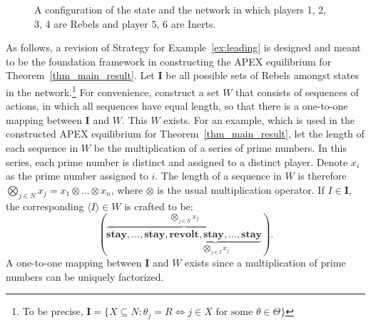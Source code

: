 \documentclass[12pt,letter]{article}
\theoremstyle{definition}
\theoremstyle{remark}
\theoremstyle{claim}
\begin{document}
\begin{figure}
\begin{center}
\end{center}
\caption{A configuration of the state and the network in which players 1, 2, 3, 4 are Rebels and player 5, 6 are Inerts.}
\label{fig:circle_with_bridge_4}
\end{figure}

As follows, a revision of Strategy for Example~\ref{ex:leading} is designed and meant to be the foundation framework in constructing the APEX equilibrium for Theorem~\ref{thm_main_result}. Let $\mathbf{I}$ be all possible sets  of Rebels amongst states in the network.\footnote{To be precise, $\mathbf{I}=\{X\subseteq N: \theta_j=R \Leftrightarrow j\in X \text{ for some $\theta\in\Theta$}\}$} 
For convenience, construct a set $W$ that consists of sequences of actions, in which all sequences have equal length, so that there is a one-to-one mapping between $\mathbf{I}$ and $W$. This $W$ exists. For an example, which is used in the constructed APEX equilibrium for Theorem~\ref{thm_main_result}, let the length of each sequence in $W$ be the multiplication of a series of prime numbers. In this series, each prime number is distinct and assigned to a distinct player. Denote $x_i$ as the prime number assigned to $i$. The length of a sequence in $W$ is therefore $\bigotimes_{j\in N}x_j=x_1\otimes...\otimes x_n$, where $\otimes$ is the usual multiplication operator. If $I\in\mathbf{I}$, the corresponding $\langle I \rangle\in W$ is crafted to be:  
\[(\overbrace{\textbf{stay},...,\textbf{stay},\underbrace{\textbf{revolt},\textbf{stay},...,\textbf{stay}}_{\bigotimes_{j\in I}x_j}}^{\bigotimes_{j\in N} x_j}).\]
A one-to-one mapping between $\mathbf{I}$ and ${W}$ exists since a multiplication of prime numbers can be uniquely factorized. 
\end{document}
